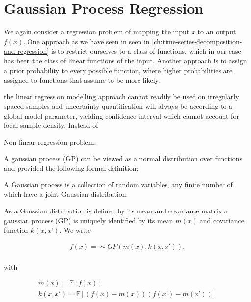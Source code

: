 \usepackage{natbib}
\usepackage{amsmath}
\usepackage{amsfonts}
\chapter{Gaussian Process Regression}
We again consider a regression problem of mapping the input $x$ to an output $f(x)$.
One approach as we have seen in seen in \ref{ch:time-series-decomposition-and-regression} is to restrict ourselves to a
class of functions, which in our case has been the class of linear functions of the input.
Another approach is to assign a prior probability to every possible function, where higher
probabilities are assigned to functions that assume to be more likely.

the linear regression modelling
approach cannot readily be used on irregularly spaced samples and uncertainty quantification
will always be according to a global model parameter, yielding confidence interval which cannot account for local sample density.
Instead of


Non-linear regression problem.

A gaussian process (GP) can be viewed as a normal distribution over functions and
\citeauthor{rasmussen_gaussian_2006} provided the following formal definition:
\begin{definition}
 A Gaussian process is a collection of random variables, any finite number of which have a joint Gaussian distribution.
\end{definition}

As a Gaussian distribution is defined by its mean and covariance matrix a gaussian process (GP) is uniquely identified
by its mean $m(x)$ and covariance function $k(x,x')$. We write

\begin{gather*}
    f(x) = \sim GP(m(x), k(x,x')), \\
\end{gather*}

with

\begin{gather*}
    m(x) = \mathbb{E}[f(x)] \\
    k(x,x') = \mathbb{E}[(f(x)-m(x))(f(x')-m(x'))]
\end{gather*}

